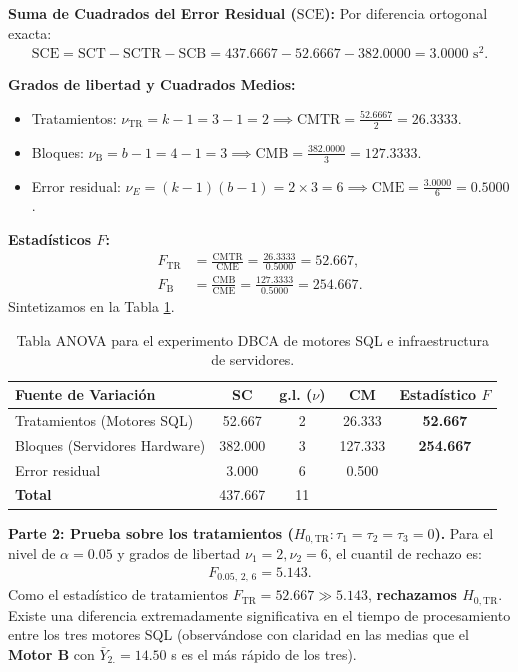\begin{solproblema}
	\textbf{Suma de Cuadrados del Error Residual ($\text{SCE}$):}
	Por diferencia ortogonal exacta:
	\begin{align}
		\text{SCE} = \text{SCT} - \text{SCTR} - \text{SCB} = 437.6667 - 52.6667 - 382.0000 = 3.0000 \text{ s}^2.
	\end{align}
	
	\textbf{Grados de libertad y Cuadrados Medios:}
	\begin{itemize}
		\item Tratamientos: $\nu_{\text{TR}} = k - 1 = 3 - 1 = 2 \implies \text{CMTR} = \frac{52.6667}{2} = 26.3333$.
		\item Bloques: $\nu_{\text{B}} = b - 1 = 4 - 1 = 3 \implies \text{CMB} = \frac{382.0000}{3} = 127.3333$.
		\item Error residual: $\nu_E = (k-1)(b-1) = 2 \times 3 = 6 \implies \text{CME} = \frac{3.0000}{6} = 0.5000$.
	\end{itemize}
	
	\textbf{Estadísticos $F$:}
	\begin{align}
		F_{\text{TR}} &= \frac{\text{CMTR}}{\text{CME}} = \frac{26.3333}{0.5000} = 52.667, \\
		F_{\text{B}} &= \frac{\text{CMB}}{\text{CME}} = \frac{127.3333}{0.5000} = 254.667.
	\end{align}
	Sintetizamos en la Tabla \ref{tab:anova_dbca_sol}.
	\begin{table}[h!]
		\centering
		\begin{tabular}{lcccc}
			\hline
			\textbf{Fuente de Variación} & \textbf{SC} & \textbf{g.l. ($\nu$)} & \textbf{CM} & \textbf{Estadístico $F$} \\ \hline
			Tratamientos (Motores SQL) & 52.667 & 2 & 26.333 & \textbf{52.667} \\
			Bloques (Servidores Hardware) & 382.000 & 3 & 127.333 & \textbf{254.667} \\
			Error residual & 3.000 & 6 & 0.500 & \\ \hline
			\textbf{Total} & 437.667 & 11 & & \\ \hline
		\end{tabular}
		\caption{Tabla ANOVA para el experimento DBCA de motores SQL e infraestructura de servidores.}
		\label{tab:anova_dbca_sol}
	\end{table}
	
	\textbf{Parte 2: Prueba sobre los tratamientos ($H_{0,\text{TR}}: \tau_1 = \tau_2 = \tau_3 = 0$).}
	Para el nivel de $\alpha = 0.05$ y grados de libertad $\nu_1 = 2, \nu_2 = 6$, el cuantil de rechazo es:
	\begin{align}
		F_{0.05, \, 2, \, 6} = 5.143.
	\end{align}
	Como el estadístico de tratamientos $F_{\text{TR}} = 52.667 \gg 5.143$, \textbf{rechazamos $H_{0,\text{TR}}$}. Existe una diferencia extremadamente significativa en el tiempo de procesamiento entre los tres motores SQL (observándose con claridad en las medias que el \textbf{Motor B} con $\bar{Y}_{2.} = 14.50$ s es el más rápido de los tres).
	

\end{solproblema}
